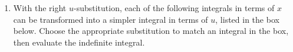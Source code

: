 \documentclass{article}
\begin{document}
\begin{enumerate}
\begin{enumerate}
\begin{enumerate}
\begin{solution}
            For the first integral, let $u=x+1$ and $du=dx$, where $u-1=x$. Thus, the substituted integral is:

            $\displaystyle \int \dfrac{u-1}{u}\,du\ = \displaystyle \int \left(\dfrac{u}{u}+\dfrac{1}{u}\right)\,du\ = \displaystyle \int \left(1-\dfrac{1}{u}\right)\,du\ =u - \ln |u| +C = (x+1) - \ln|x+1| +C$
        \end{solution}
        \end{enumerate}
\pspace{\vfill}   
\pspace{\vfill}
\pspace{\vfill}
\pspace{\vfill}
\pspace{\vfill}
\end{enumerate}
\item With the right $u$-substitution, each of the following integrals in terms of $x$ can be transformed into a simpler integral in terms of $u$, listed in the box below. Choose the appropriate substitution to match an integral in the box, then evaluate the indefinite integral.
\begin{center}
\end{center}
\end{enumerate}
\end{document}
